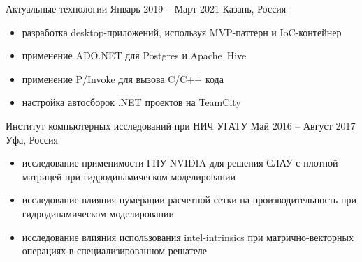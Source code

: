 \documentclass[10pt,a4paper,ragged2e,withhyper]{altacv}
\begin{document}

\makecvheader



\begin{paracol}{2}



{Актуальные технологии}
{Январь 2019 -- Март 2021}
{Казань, Россия}

\begin{itemize}

  \item разработка desktop-приложений, используя MVP-паттерн и IoC-контейнер
  \smallskip

  \item применение ADO.NET для Postgres и Apache~Hive
  \smallskip

  \item применение P/Invoke для вызова C/C++ кода
  \smallskip

  \item настройка автосборок .NET проектов на TeamCity

\end{itemize}

\divider

{Институт компьютерных исследований при НИЧ УГАТУ}
{Май 2016 -- Август 2017}
{Уфа, Россия}

\begin{itemize}

  \item исследование применимости ГПУ NVIDIA для
  решения СЛАУ с плотной матрицей при гидродинамическом моделировании
  \smallskip

  \item исследование влияния нумерации расчетной сетки на
  \newline производительность при гидродинамическом моделировании
  \smallskip

  \item исследование влияния использования intel-intrinsics при матрично-векторных операциях в специализированном решателе
  \smallskip


\end{itemize}
\end{paracol}
\end{document}
